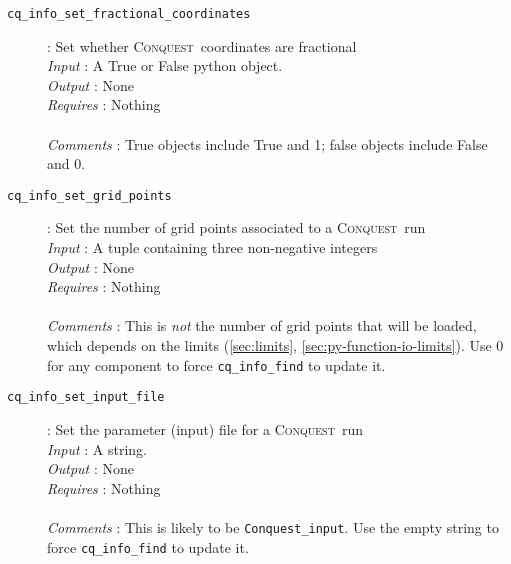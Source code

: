 \documentclass[a4paper,notitlepage,11pt]{article}
\def\CQ{\textsc{Conquest}}
\begin{document}
\begin{description}
\item[\texttt{cq\_info\_set\_fractional\_coordinates}]: Set whether
\CQ\ coordinates are fractional\\ 
\emph{Input} : A True or False python object.\\
\emph{Output} : None\\
\emph{Requires} : Nothing\\
  \\
  \emph{Comments} : True objects include True and 1; false objects include
  False and 0.
\end{description}

\begin{description}
\item[\texttt{cq\_info\_set\_grid\_points}]: Set the number of grid points associated to a \CQ\ run\\
  \emph{Input} : A tuple containing three non-negative integers\\
  \emph{Output} : None\\
  \emph{Requires} : Nothing\\
  \\
  \emph{Comments} : This is \emph{not} the number of grid points that will be loaded, which depends on the limits 
  (\ref{sec:limits}, \ref{sec:py-function-io-limits}).
  Use 0 for any component to force \texttt{cq\_info\_find} to update it.
\end{description}

\begin{description}
\item[\texttt{cq\_info\_set\_input\_file}]: Set the parameter (input) file for a \CQ\ run\\
  \emph{Input} : A string.\\
  \emph{Output} : None\\
  \emph{Requires} : Nothing\\
  \\
  \emph{Comments} : This is likely to be \texttt{Conquest\_input}. 
  Use the empty string to force \texttt{cq\_info\_find} to update it.
\end{description}
\end{document}
